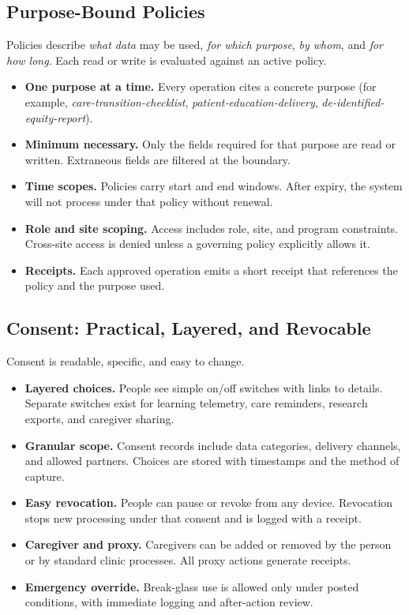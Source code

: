 \documentclass[12pt]{article}
\begin{document}
\subsection*{Purpose-Bound Policies}
Policies describe \emph{what data} may be used, \emph{for which purpose}, \emph{by whom}, and \emph{for how long}. Each read or write is evaluated against an active policy.
\begin{itemize}[leftmargin=*]
  \item \textbf{One purpose at a time.} Every operation cites a concrete purpose (for example, \textit{care-transition-checklist}, \textit{patient-education-delivery}, \textit{de-identified-equity-report}).
  \item \textbf{Minimum necessary.} Only the fields required for that purpose are read or written. Extraneous fields are filtered at the boundary.
  \item \textbf{Time scopes.} Policies carry start and end windows. After expiry, the system will not process under that policy without renewal.
  \item \textbf{Role and site scoping.} Access includes role, site, and program constraints. Cross-site access is denied unless a governing policy explicitly allows it.
  \item \textbf{Receipts.} Each approved operation emits a short receipt that references the policy and the purpose used.
\end{itemize}

\subsection*{Consent: Practical, Layered, and Revocable}
Consent is readable, specific, and easy to change.
\begin{itemize}[leftmargin=*]
  \item \textbf{Layered choices.} People see simple on/off switches with links to details. Separate switches exist for learning telemetry, care reminders, research exports, and caregiver sharing.
  \item \textbf{Granular scope.} Consent records include data categories, delivery channels, and allowed partners. Choices are stored with timestamps and the method of capture.
  \item \textbf{Easy revocation.} People can pause or revoke from any device. Revocation stops new processing under that consent and is logged with a receipt.
  \item \textbf{Caregiver and proxy.} Caregivers can be added or removed by the person or by standard clinic processes. All proxy actions generate receipts.
  \item \textbf{Emergency override.} Break-glass use is allowed only under posted conditions, with immediate logging and after-action review.
\end{itemize}
\end{document}
